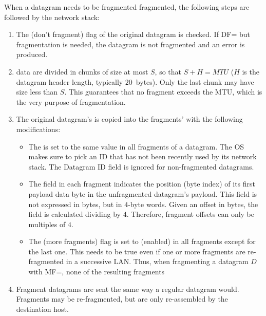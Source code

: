 When a datagram needs to be fragmented fragmented, the following steps are followed 
by the network stack:
\begin{enumerate}

\item The  (don't fragment) flag of the original datagram is checked. 
    If DF= but fragmentation is needed, the datagram is not fragmented 
    and an error is produced.\\[-0.2cm]

\item {} data are divided in chunks of size at most $S$, so that $S + H = MTU$ 
  ($H$ is the datagram header length, typically $20$~bytes). Only the last chunk
  may have size less than $S$. This guarantees that no fragment exceeds the MTU,
  which is the very purpose of fragmentation.\\[-0.2cm]
  
\item The original datagram's  is copied into the fragments' with the following modifications:
  \begin{itemize}
  \item The  is set to the same value in all fragments of a datagram. 
    The OS makes sure to pick an ID that has not been recently used by its network stack.
    The Datagram ID field is ignored for non-fragmented datagrams.\\[-0.3cm]
    
  \item The  field in each fragment indicates the position (byte index)
    of its first payload data byte in the unfragmented datagram's payload.
    This field is not expressed in bytes, but in $4$-byte words.
    Given an offset in bytes, the  field is calculated dividing by $4$.
    Therefore, fragment offsets can only be multiples of $4$.\\[-0.3cm]
    
  \item The  (more fragments) flag is set to  (enabled) 
    in all fragments except for the last one. This needs to be true even if one or more
    fragments are re-fragmented in a successive LAN. Thus, when fragmenting a 
    datagram $D$ with MF=, none of the resulting fragments\\[-0.2cm]
  \end{itemize}
  
\item Fragment datagrams are sent the same way a regular datagram would.
  Fragments may be re-fragmented, but are only re-assembled by the destination host.
  
\end{enumerate}


